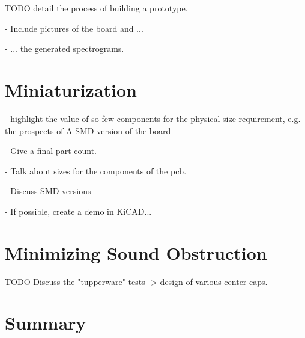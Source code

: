 TODO detail the process of building a prototype.

- Include pictures of the board and ...

- ... the generated spectrograms.

\section{Miniaturization}
- highlight the value of so few components for the physical size requirement, e.g. the prospects of A SMD version of the board

- Give a final part count.

- Talk about sizes for the components of the pcb.

- Discuss SMD versions

- If possible, create a demo in KiCAD...

\section{Minimizing Sound Obstruction}
TODO Discuss the "tupperware" tests -> design of various center caps.

\section{Summary}
